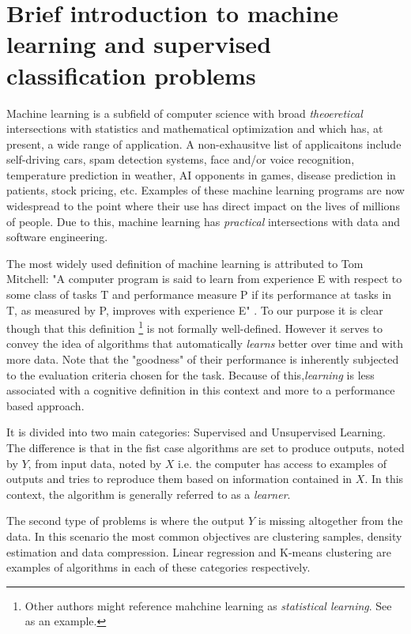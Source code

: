 
\section{ Brief introduction to machine learning and supervised classification problems}

Machine learning is a subfield of computer science with broad \textit{theoeretical} intersections with statistics and mathematical optimization and which has, at present, a wide range of application. A non-exhausitve list of applicaitons include self-driving cars, spam detection systems, face and/or voice recognition, temperature prediction in weather, AI opponents in games, disease prediction in patients, stock pricing, etc. Examples of these machine learning programs are now widespread to the point where their use has direct impact on the lives of millions of people. Due to this, machine learning has \textit{practical} intersections with data and software engineering.

The most widely used definition of machine learning is attributed to Tom Mitchell: 	 
"A computer program is said to learn from experience E with respect to some class of tasks T and performance measure P if its performance at tasks in T, as measured by P, improves with experience E" \cite{Mitchell-MLearning}. To our purpose it is clear though that this definition \footnote{Other authors might reference mahchine learning as \textit{statistical learning}. See \cite{hastie-elemstatslearn} as an example.} is not formally well-defined. However it serves to convey the idea of algorithms that automatically \textit{learns} better over time and with more data. Note that the "goodness" of their performance is inherently subjected to the evaluation criteria chosen for the task. Because of this,\textit{learning} is less associated with a cognitive definition in this context and more to a performance based approach.

It is divided into two main categories: Supervised and Unsupervised Learning. The difference is that in the fist case algorithms are set to produce outputs, noted by $Y$, from input data, noted by $X$ i.e. the computer has access to examples of outputs and tries to reproduce them based on information contained in $X$. In this context, the algorithm is generally referred to as a \textit{learner}.

The second type of problems is where the output $Y$ is missing altogether from the data. In this scenario the most common objectives are clustering samples, density estimation and data compression. Linear regression and K-means clustering are examples of algorithms in each of these categories respectively.

